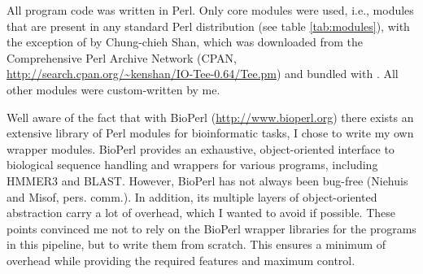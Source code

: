 All program code was written in Perl. Only core modules were used, i.e., modules
that are present in any standard Perl distribution (see table \ref{tab:modules}),
with the exception of  by Chung-chieh Shan, which was downloaded
from the Comprehensive Perl Archive Network (CPAN,
\url{http://search.cpan.org/~kenshan/IO-Tee-0.64/Tee.pm}) and bundled with
\pname. All other modules were custom-written by me.



Well aware of the fact that with BioPerl (\url{http://www.bioperl.org}) there
exists an extensive library of Perl modules for bioinformatic tasks, I chose to
write my own wrapper modules. BioPerl provides an exhaustive, object-oriented
interface to biological sequence handling and wrappers for various programs,
including HMMER3 and BLAST. However, BioPerl has not always been bug-free
(Niehuis and Misof, pers. comm.). In addition, its multiple layers of
object-oriented abstraction carry a lot of overhead, which I wanted to avoid
if possible. These points convinced me not to rely on the BioPerl wrapper
libraries for the programs in this pipeline, but to write them from scratch.
This ensures a minimum of overhead while providing the required features and
maximum control.
